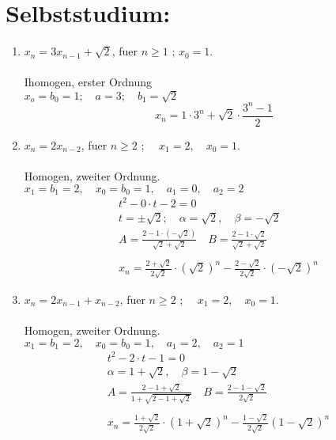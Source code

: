     \section*{Selbststudium:}
    \begin{enumerate}[label=(\alph*)]
    	\item $x_n = 3x_{n-1}+ \sqrt{2}$, fuer $n \geq 1 $ ; $ x_0 = 1.$ \\ \\
    	Ihomogen, erster Ordnung \\
    	$ x_o = b_0 =1 ; \quad a=3; \quad b_1 = \sqrt{2} $ 
    	\[x_n =1 \cdot 3^n + \sqrt{2} \cdot \frac{3^n -1}{2} \]
    	\item $x_n = 2x_{n-2}$, fuer $n \geq 2 $ ;  $\quad x_1 = 2, \quad x_0 =1 .$ \\ \\
    	Homogen, zweiter Ordnung.\\
    	$x_1 =b_1 = 2, \quad x_0=b_0=1, \quad a_1=0, \quad a_2=2$
    	\begin{align*}
    		&t^2-0 \cdot t -2 =0 \\
    		&t= \pm \sqrt{2} ; \quad \alpha = \sqrt{2}, \quad \beta = -\sqrt{2} \\
    		&A = \frac{2-1\cdot (- \sqrt{2} )}{\sqrt{2}+\sqrt{2}} \quad B = \frac{2-1\cdot  \sqrt{2} }{\sqrt{2}+\sqrt{2}} \\\\
    		&x_n = \frac{2+\sqrt{2}}{2\sqrt{2}} \cdot (\sqrt{2})^n - \frac{2-\sqrt{2}}{2\sqrt{2}} \cdot (-\sqrt{2})^n
    	\end{align*}
    	\item $x_n = 2x_{n-1} +x_{n-2}$, fuer $n \geq 2 $ ;  $\quad x_1 = 2, \quad x_0 =1 .$ \\ \\
    	Homogen, zweiter Ordnung. \\
    	    	$x_1 =b_1 = 2, \quad x_0=b_0=1, \quad a_1=2, \quad a_2=1$\\
    	    	\begin{align*}
    	    		   &t^2-2 \cdot t -1 =0 \\
						&\alpha = 1+\sqrt{2}, \quad \beta = 1-\sqrt{2} \\
						&A= \frac{2-1+\sqrt{2}}{1+\sqrt{2-1+\sqrt{2}}} \quad B = \frac{2-1-\sqrt{2}}{2\sqrt{2}} \\ \\
						&x_n=\frac{1+\sqrt{2}}{2\sqrt{2}} \cdot(1+ \sqrt{2} )^n - \frac{1-\sqrt{2}}{2\sqrt{2}}(1-\sqrt{2})^n
    	    	\end{align*}

\end{enumerate}
